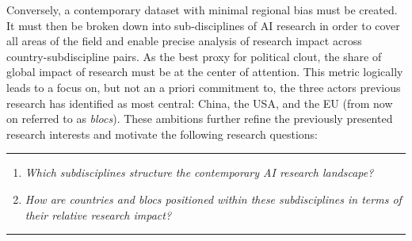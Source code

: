 \documentclass{article}
\begin{document}
	Conversely, a contemporary dataset with minimal regional bias must be created. It must then be broken down into sub-disciplines of AI research in order to cover all areas of the field and enable precise analysis of research impact across country-subdiscipline pairs. As the best proxy for political clout, the share of global impact of research must be at the center of attention. This metric logically leads to a focus on, but not an a priori commitment to, the three actors previous research has identified as most central: China, the USA, and the EU (from now on referred to as \textit{blocs}). These ambitions further refine the previously presented research interests and motivate the following research questions:
	
	\vspace{1em}
	\rule{\linewidth}{0.4pt}
	
	\begin{enumerate}
		\item[\textbf{RQ1}]\hspace*{2em}\parbox[t]{\dimexpr\linewidth-2em}{
			\textit{Which subdisciplines structure the contemporary AI research landscape?}
		}
		\vspace{0.5em}
		
		\item[\textbf{RQ2}]\hspace*{2em}\parbox[t]{\dimexpr\linewidth-2em}{
			\textit{How are countries and blocs positioned within these subdisciplines in terms of their relative research impact?}
		}
	\end{enumerate}
	
	\vspace{0.25em}
	\rule{\linewidth}{0.4pt}
	\vspace{1em}
	
\end{document}
